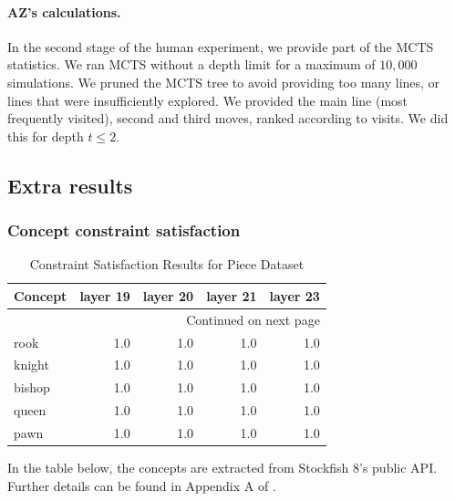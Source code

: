\documentclass{article}
\begin{document}
\paragraph{AZ's calculations.}
In the second stage of the human experiment, we provide part of the MCTS statistics.
We ran MCTS without a depth limit for a maximum of $10,000$ simulations. 
We pruned the MCTS tree to avoid providing too many lines, or lines that were insufficiently explored. We provided the main line (most frequently visited), second and third moves, ranked according to visits. We did this for depth $t \leq 2$. 

\newpage 
\subsection{Extra results} \label{appx:more_results}

\subsubsection{Concept constraint satisfaction} \label{appx:res:cp}

\begin{longtable}[ht]{lrrrr}
\caption{Constraint Satisfaction Results for Piece Dataset}
\label{table:cp_pieces} \\ 
\toprule
Concept  &  layer 19 &  layer 20 &  layer 21 &  layer 23 \\
\midrule
\endhead
\midrule
\multicolumn{5}{r}{{Continued on next page}} \\
\midrule
\endfoot
\bottomrule
\endlastfoot
   rook &      1.0 &      1.0 &      1.0 &      1.0 \\
 knight &      1.0 &      1.0 &      1.0 &      1.0 \\
 bishop &      1.0 &      1.0 &      1.0 &      1.0 \\
  queen &      1.0 &      1.0 &      1.0 &      1.0 \\
   pawn &      1.0 &      1.0 &      1.0 &      1.0 \\
\end{longtable}

In the table below, the concepts are extracted from Stockfish 8's public API. Further details can be found in Appendix A of \cite{mcgrath2022acquisition}. 

\newpage 
\end{document}
